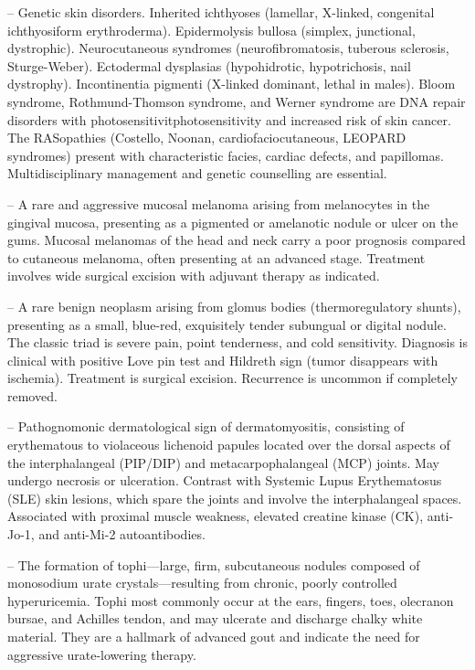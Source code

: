 -- Genetic skin disorders. Inherited ichthyoses (lamellar, X-linked, congenital ichthyosiform erythroderma). Epidermolysis bullosa (simplex, junctional, dystrophic). Neurocutaneous syndromes (neurofibromatosis, tuberous sclerosis, Sturge-Weber). Ectodermal dysplasias (hypohidrotic, hypotrichosis, nail dystrophy). Incontinentia pigmenti (X-linked dominant, lethal in males). Bloom syndrome, Rothmund-Thomson syndrome, and Werner syndrome are DNA repair disorders with photosensitivitphotosensitivity and increased risk of skin cancer. The RASopathies (Costello, Noonan, cardiofaciocutaneous, LEOPARD syndromes) present with characteristic facies, cardiac defects, and papillomas. Multidisciplinary management and genetic counselling are essential.

-- A rare and aggressive mucosal melanoma arising from melanocytes in the gingival mucosa, presenting as a pigmented or amelanotic nodule or ulcer on the gums. Mucosal melanomas of the head and neck carry a poor prognosis compared to cutaneous melanoma, often presenting at an advanced stage. Treatment involves wide surgical excision with adjuvant therapy as indicated.

-- A rare benign neoplasm arising from glomus bodies (thermoregulatory shunts), presenting as a small, blue-red, exquisitely tender subungual or digital nodule. The classic triad is severe pain, point tenderness, and cold sensitivity. Diagnosis is clinical with positive Love pin test and Hildreth sign (tumor disappears with ischemia). Treatment is surgical excision. Recurrence is uncommon if completely removed.

-- Pathognomonic dermatological sign of dermatomyositis, consisting of erythematous to violaceous lichenoid papules located over the dorsal aspects of the interphalangeal (PIP/DIP) and metacarpophalangeal (MCP) joints. May undergo necrosis or ulceration. Contrast with Systemic Lupus Erythematosus (SLE) skin lesions, which spare the joints and involve the interphalangeal spaces. Associated with proximal muscle weakness, elevated creatine kinase (CK), anti-Jo-1, and anti-Mi-2 autoantibodies.

-- The formation of tophi—large, firm, subcutaneous nodules composed of monosodium urate crystals—resulting from chronic, poorly controlled hyperuricemia. Tophi most commonly occur at the ears, fingers, toes, olecranon bursae, and Achilles tendon, and may ulcerate and discharge chalky white material. They are a hallmark of advanced gout and indicate the need for aggressive urate-lowering therapy.

